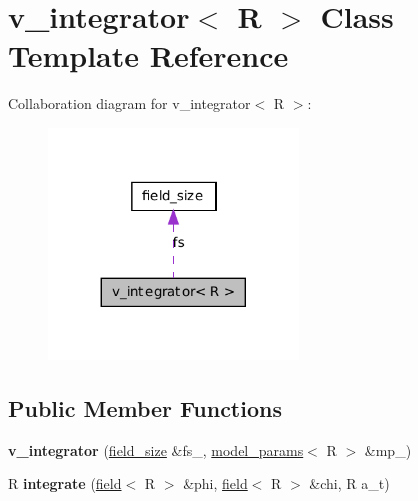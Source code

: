 \hypertarget{classv__integrator}{
\section{v\_\-integrator$<$ R $>$ Class Template Reference}
\label{classv__integrator}
}


Collaboration diagram for v\_\-integrator$<$ R $>$:
\nopagebreak
\begin{figure}[H]
\begin{center}
\leavevmode
\includegraphics[width=188pt]{classv__integrator__coll__graph}
\end{center}
\end{figure}
\subsection*{Public Member Functions}
\begin{DoxyCompactItemize}
\item 
\hypertarget{classv__integrator_a2f408bba9ba58a93d1528b0a24550e4b}{
{\bfseries v\_\-integrator} (\hyperlink{structfield__size}{field\_\-size} \&fs\_\-, \hyperlink{structmodel__params}{model\_\-params}$<$ R $>$ \&mp\_\-)}
\label{classv__integrator_a2f408bba9ba58a93d1528b0a24550e4b}

\item 
\hypertarget{classv__integrator_a2540dad37d2abb657133673f647572d8}{
R {\bfseries integrate} (\hyperlink{classfield}{field}$<$ R $>$ \&phi, \hyperlink{classfield}{field}$<$ R $>$ \&chi, R a\_\-t)}
\label{classv__integrator_a2540dad37d2abb657133673f647572d8}

\end{DoxyCompactItemize}

